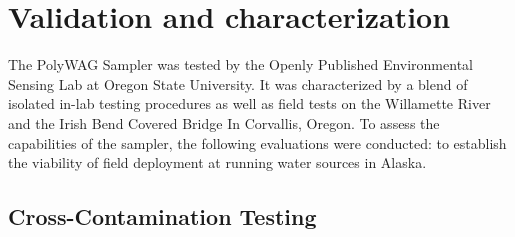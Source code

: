 \documentclass[11pt, letterpaper]{article}
\begin{document}
\section{Validation and characterization}


The PolyWAG Sampler was tested by the Openly Published Environmental Sensing Lab at Oregon State University. It was characterized by a blend of isolated in-lab testing procedures as well as field tests on the Willamette River and the Irish Bend Covered Bridge In Corvallis, Oregon. To assess the capabilities of the sampler, the following evaluations were conducted: to establish the viability of field deployment at running water sources in Alaska.

\subsection{Cross-Contamination Testing}
\end{document}
